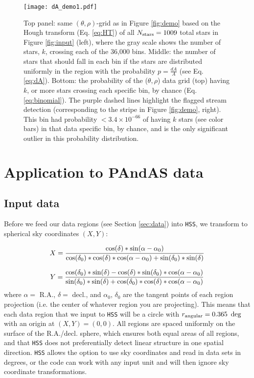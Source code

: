 \documentclass[twocolumn]{aastex631}
\begin{document}
\begin{figure}
\centerline{\texttt{[image: dA\_demo1.pdf]}}
\caption{Top panel: same $(\theta,\rho)$-grid as in Figure \ref{fig:demo} based on the Hough transform (Eq. \ref{eq:HT}) of all $N_{\rm stars} = 1009$ total stars in Figure \ref{fig:input} (left), where the gray scale shows the number of stars, $k$, crossing each of the 36,000 bins.
Middle: the number of stars that should fall in each bin if the stars are distributed uniformly in the region with the probability $p=\frac{dA}{A}$ (see Eq. \ref{eq:dA}).
Bottom: the probability of the ($\theta,\rho$) data grid (top) having $k$, or more stars crossing each specific bin, by chance (Eq. \ref{eq:binomial}). The purple dashed lines highlight the flagged stream detection (corresponding to the stripe in Figure \ref{fig:demo}, right). This bin had probability $< 3.4 \times 10^{-66}$ of having $k$ stars (see color bars) in that data specific bin, by chance, and is the only significant outlier in this probability distribution.}
\label{fig:dA_demo}
\end{figure}


\section{Application to PAndAS data}\label{sec:applypandas}

\subsection{Input data}\label{sec:input}
Before we feed our data regions (see Section \ref{sec:data}) into \texttt{HSS}, we transform to spherical sky coordinates $(X,Y)$:


\begin{equation}
\begin{aligned}\label{eq:sphere}
    X = 
    \frac{\rm cos(\delta) * sin(\alpha - \alpha_0)}{\rm cos(\delta_0)*cos(\delta)*cos(\alpha-\alpha_0) + sin(\delta_0)*sin(\delta)}
\end{aligned}
\end{equation}

\begin{equation}
Y = \frac{\rm cos(\delta_0) * sin(\delta) - cos(\delta) * sin(\delta_0) *cos(\alpha-\alpha_0)}{\rm sin(\delta_0)*sin(\delta) + cos(\delta_0)*cos(\delta)*cos(\alpha - \alpha_0)}
\end{equation}
where $\alpha = $ R.A., $\delta = $ decl., and $\alpha_0$, $\delta_0 $ are the tangent points of each region projection (i.e. the center of whatever region you are projecting). This means that each data region that we input to \texttt{HSS} will be a circle with $r_{\rm angular} = 0.365~ \deg$ with an origin at $(X,Y) = (0,0)$. All regions are spaced uniformly on the surface of the R.A./decl. sphere, which ensures both equal areas of all regions, and that \texttt{HSS} does not preferentially detect linear structure in one spatial direction.
\texttt{HSS} allows the option to use sky coordinates and read in data sets in degrees, or the code can work with any input unit  and will then ignore sky coordinate transformations. 
\end{document}
